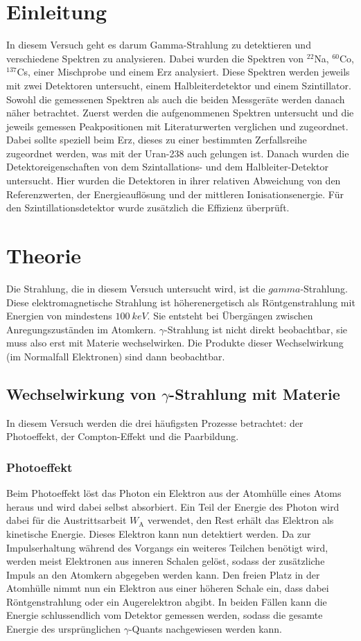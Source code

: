 \section{Einleitung}
In diesem Versuch geht es darum Gamma-Strahlung zu detektieren und verschiedene Spektren zu analysieren. Dabei wurden die Spektren von $^{22}$Na, $^{60}$Co, $^{137}$Cs, einer Mischprobe und einem Erz analysiert. Diese Spektren werden jeweils mit zwei Detektoren untersucht, einem Halbleiterdetektor und einem Szintillator. Sowohl die gemessenen Spektren als auch die beiden Messgeräte werden danach näher betrachtet. Zuerst werden die aufgenommenen Spektren untersucht und die jeweils gemessen Peakpositionen mit Literaturwerten verglichen und zugeordnet. Dabei sollte speziell beim Erz, dieses zu einer bestimmten Zerfallsreihe zugeordnet werden, was mit der Uran-238 auch gelungen ist.
Danach wurden die Detektoreigenschaften von dem Szintallations- und dem Halbleiter-Detektor untersucht. Hier wurden die Detektoren in ihrer relativen Abweichung von den Referenzwerten, der Energieauflösung und der mittleren Ionisationsenergie. Für den Szintillationsdetektor wurde zusätzlich die Effizienz überprüft.




\section{Theorie}
Die Strahlung, die in diesem Versuch untersucht wird, ist die $gamma$-Strahlung. Diese elektromagnetische Strahlung ist höherenergetisch als Röntgenstrahlung mit Energien von mindestens $\SI{100}{keV}$. Sie entsteht bei Übergängen zwischen Anregungszuständen im Atomkern. $\gamma$-Strahlung ist nicht direkt beobachtbar, sie muss also erst mit Materie wechselwirken. Die Produkte dieser Wechselwirkung (im Normalfall Elektronen) sind dann beobachtbar.

\subsection{Wechselwirkung von $\gamma$-Strahlung mit Materie}
In diesem Versuch werden die drei häufigsten Prozesse betrachtet: der Photoeffekt, der Compton-Effekt und die Paarbildung.
\subsubsection{Photoeffekt}
Beim Photoeffekt löst das Photon ein Elektron aus der Atomhülle eines Atoms heraus und wird dabei selbst absorbiert. Ein Teil der Energie des Photon wird dabei für die Austrittsarbeit $W_\text{A}$ verwendet, den Rest erhält das Elektron als kinetische Energie. Dieses Elektron kann nun detektiert werden. Da zur Impulserhaltung während des Vorgangs ein weiteres Teilchen benötigt wird, werden meist Elektronen aus inneren Schalen gelöst, sodass der zusätzliche Impuls an den Atomkern abgegeben werden kann. Den freien Platz in der Atomhülle nimmt nun ein Elektron aus einer höheren Schale ein, dass dabei Röntgenstrahlung oder ein Augerelektron abgibt. In beiden Fällen kann die Energie schlussendlich vom Detektor gemessen werden, sodass die gesamte Energie des ursprünglichen $\gamma$-Quants nachgewiesen werden kann.

